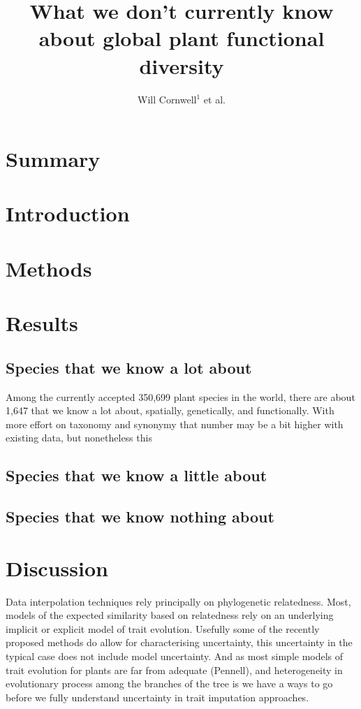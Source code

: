 \documentclass[a4paper,11pt]{article}
\title{What we don't currently know about global plant functional diversity}
\author{
Will Cornwell$^1$
et al.}
\affiliation{
*final list and order undecided\\
$^1$ University of NSW\\
}
\date{}
\begin{document}
\mstitlepage
\noindent

\section{Summary}


\section{Introduction}

\section{Methods}

\section{Results}

\subsection{Species that we know a lot about}

Among the currently accepted 350,699 plant species in the world, there are about 1,647 that we know a lot about, spatially, genetically, and functionally.  With more effort on taxonomy and synonymy that number may be a bit higher with existing data, but nonetheless this 

\subsection{Species that we know a little about}

\subsection{Species that we know nothing about}


\section{Discussion}




Data interpolation techniques rely principally on phylogenetic relatedness.  
Most, models of the expected similarity based on relatedness rely on an underlying implicit or explicit model of trait evolution.  
Usefully some of the recently proposed methods do allow for characterising uncertainty, this uncertainty in the typical case
does not include model uncertainty.  And as most simple models of trait evolution for plants are far from adequate (Pennell), and heterogeneity in evolutionary 
process among the branches of the tree is 
we have a ways to go before we fully understand uncertainty in trait imputation approaches.   
\end{document}
